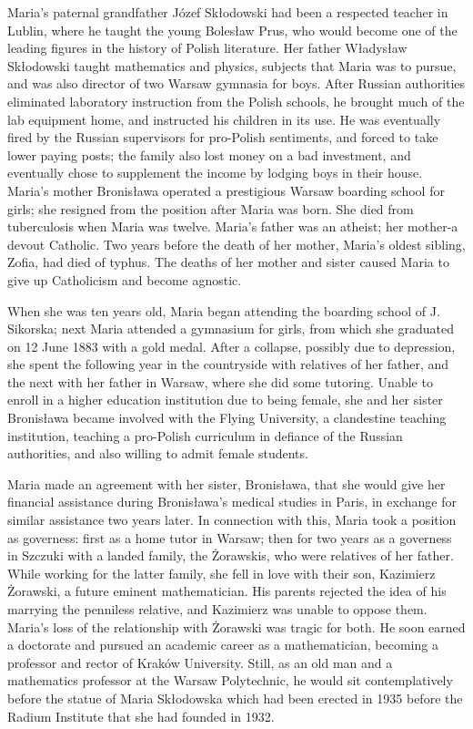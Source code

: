 \documentclass[12pt,a4paper]{article}
\begin{document}
Maria's paternal grandfather J\'ozef Sk\l{}odowski had been a respected teacher in Lublin, where he taught the young Boles\l{}aw Prus, who would become one of the leading figures in the history of Polish literature. Her father W\l{}adys\l{}aw Sk\l{}odowski taught mathematics and physics, subjects that Maria was to pursue, and was also director of two Warsaw gymnasia for boys. After Russian authorities eliminated laboratory instruction from the Polish schools, he brought much of the lab equipment home, and instructed his children in its use. He was eventually fired by the Russian supervisors for pro-Polish sentiments, and forced to take lower paying posts; the family also lost money on a bad investment, and eventually chose to supplement the income by lodging boys in their house. Maria's mother Bronis\l{}awa operated a prestigious Warsaw boarding school for girls; she resigned from the position after Maria was born. She died from tuberculosis when Maria was twelve. Maria's father was an atheist; her mother-a devout Catholic.\cite{Barker:2011:TGA} Two years before the death of her mother, Maria's oldest sibling, Zofia, had died of typhus. The deaths of her mother and sister caused Maria to give up Catholicism and become agnostic.

When she was ten years old, Maria began attending the boarding school of J. Sikorska; next Maria attended a gymnasium for girls, from which she graduated on 12 June 1883 with a gold medal. After a collapse, possibly due to depression, she spent the following year in the countryside with relatives of her father, and the next with her father in Warsaw, where she did some tutoring. Unable to enroll in a higher education institution due to being female, she and her sister Bronis\l{}awa became involved with the Flying University, a clandestine teaching institution, teaching a pro-Polish curriculum in defiance of the Russian authorities, and also willing to admit female students.

Maria made an agreement with her sister, Bronis\l{}awa, that she would give her financial assistance during Bronis\l{}awa's medical studies in Paris, in exchange for similar assistance two years later. In connection with this, Maria took a position as governess: first as a home tutor in Warsaw; then for two years as a governess in Szczuki with a landed family, the \.Zorawskis, who were relatives of her father. While working for the latter family, she fell in love with their son, Kazimierz \.Zorawski, a future eminent mathematician. His parents rejected the idea of his marrying the penniless relative, and Kazimierz was unable to oppose them. Maria's loss of the relationship with \.Zorawski was tragic for both. He soon earned a doctorate and pursued an academic career as a mathematician, becoming a professor and rector of Krak\'ow University. Still, as an old man and a mathematics professor at the Warsaw Polytechnic, he would sit contemplatively before the statue of Maria Sk\l{}odowska which had been erected in 1935 before the Radium Institute that she had founded in 1932.
\end{document}
